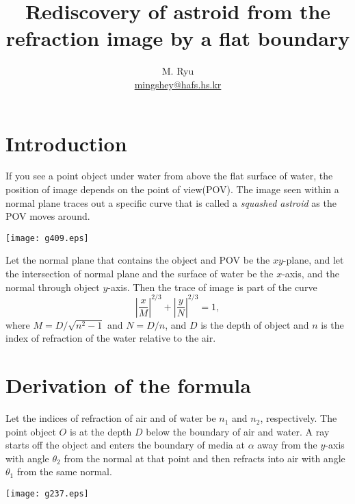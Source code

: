 \documentclass[twocolumn]{article}
\title{Rediscovery of astroid from the refraction image by a flat boundary}
\author{M. Ryu \\ {\href{mailto:mingshey@hafs.hs.kr}{mingshey@hafs.hs.kr}}}
\begin{document}
\maketitle
\section{Introduction}
If you see a point object under water from  above the flat surface of water, 
the position of image depends on the point of view(POV). The image seen
 within a normal plane traces out a specific curve that is called a  
 \emph{squashed astroid} as the POV moves around.

\texttt{[image: g409.eps]}

Let the normal plane that contains the object and  POV be the $xy$-plane,
 and let the intersection of  normal plane and the surface of water be the 
 $x$-axis, and the normal through  object $y$-axis. Then the trace of image 
 is part of the curve 
$$ \left| \dfrac{x}{M} \right| ^ {2/3} 
+ \left| \dfrac{y}{N} \right| ^ {2/3} = 1,$$
where $M = D/\sqrt{n^2 - 1}$ and $N = D/n$, and $D$ is the depth of object
 and $n$ is the index of refraction of the water relative to the air.

\section{Derivation of the formula}
Let the indices of refraction  of air and of water be $n_1$ and $n_2$,
respectively. The point object $O$ is at the depth $D$ below 
the boundary of air and water. A ray starts off the object and enters the boundary of media at 
$\alpha$ away from the $y$-axis with angle $\theta_2$ from the normal at 
that point and then refracts into air with angle $\theta_1$ from the same 
normal.

\texttt{[image: g237.eps]}
\end{document}
